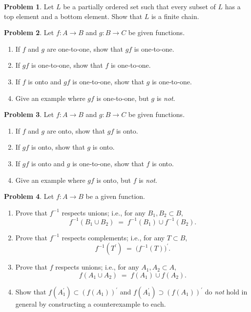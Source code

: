 \documentclass[10pt]{article}
\theoremstyle{definition} %
\newtheorem{problem}{Problem}
\theoremstyle{plain} %
\begin{document}
\begin{problem}
    Let $L$ be a partially ordered set such that every subset of $L$ has a top element and a bottom element.
    Show that $L$ is a finite chain.
\end{problem}
\begin{problem}
  Let $f : A \to B$ and $g : B \to C$ be given functions.
  \begin{enumerate}[label=(\alph*)]
      \item If $f$ and $g$ are one‑to‑one, show that $gf$ is one‑to‑one.
      \item If $gf$ is one‑to‑one, show that $f$ is one‑to‑one.
      \item If $f$ is onto and $gf$ is one‑to‑one, show that $g$ is one‑to‑one.
      \item Give an example where $gf$ is one‑to‑one, but $g$ is \emph{not}.
  \end{enumerate}
\end{problem}

\begin{problem}
  Let $f : A \to B$ and $g : B \to C$ be given functions.
  \begin{enumerate}[label=(\alph*)]
      \item If $f$ and $g$ are onto, show that $gf$ is onto.
      \item If $gf$ is onto, show that $g$ is onto.
      \item If $gf$ is onto and $g$ is one‑to‑one, show that $f$ is onto.
      \item Give an example where $gf$ is onto, but $f$ is \emph{not}.
  \end{enumerate}
\end{problem}

\begin{problem}
  Let $f : A \to B$ be a given function.
  \begin{enumerate}[label=(\alph*)]
      \item Prove that $f^{-1}$ respects unions; i.e., for any $B_1, B_2 \subset B$,
            \[
                f^{-1}(B_1 \cup B_2) \;=\; f^{-1}(B_1) \cup f^{-1}(B_2).
            \]
      \item Prove that $f^{-1}$ respects complements; i.e., for any $T \subset B$,
            \[
                f^{-1}(T^{\prime}) \;=\; \bigl(f^{-1}(T)\bigr)^{\prime}.
            \]
      \item Prove that $f$ respects unions; i.e., for any $A_1, A_2 \subset A$,
            \[
                f(A_1 \cup A_2) \;=\; f(A_1) \cup f(A_2).
            \]
      \item Show that $f(A_1^{\prime}) \subset (f(A_1))^{\prime}$ and
            $f(A_1^{\prime}) \supset (f(A_1))^{\prime}$ do \emph{not} hold in general by
            constructing a counterexample to each.
  \end{enumerate}
\end{problem}
\end{document}
